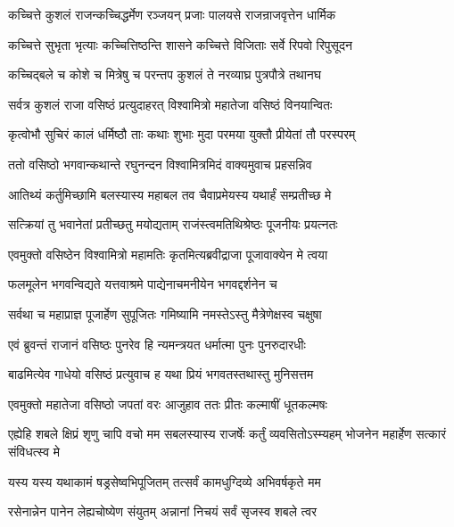 \twolineshloka
{कच्चित्ते कुशलं राजन्कच्चिद्धर्मेण रञ्जयन्}
{प्रजाः पालयसे राजन्राजवृत्तेन धार्मिक} %

\twolineshloka
{कच्चित्ते सुभृता भृत्याः कच्चित्तिष्ठन्ति शासने}
{कच्चित्ते विजिताः सर्वे रिपवो रिपुसूदन} %

\twolineshloka
{कच्चिद्बले च कोशे च मित्रेषु च परन्तप}
{कुशलं ते नरव्याघ्र पुत्रपौत्रे तथानघ} %

\twolineshloka
{सर्वत्र कुशलं राजा वसिष्ठं प्रत्युदाहरत्}
{विश्वामित्रो महातेजा वसिष्ठं विनयान्वितः} %

\twolineshloka
{कृत्वोभौ सुचिरं कालं धर्मिष्ठौ ताः कथाः शुभाः}
{मुदा परमया युक्तौ प्रीयेतां तौ परस्परम्} %

\twolineshloka
{ततो वसिष्ठो भगवान्कथान्ते रघुनन्दन}
{विश्वामित्रमिदं वाक्यमुवाच प्रहसन्निव} %

\twolineshloka
{आतिथ्यं कर्तुमिच्छामि बलस्यास्य महाबल}
{तव चैवाप्रमेयस्य यथार्हं सम्प्रतीच्छ मे} %

\twolineshloka
{सत्क्रियां तु भवानेतां प्रतीच्छतु मयोद्यताम्}
{राजंस्त्वमतिथिश्रेष्ठः पूजनीयः प्रयत्नतः} %

\twolineshloka
{एवमुक्तो वसिष्ठेन विश्वामित्रो महामतिः}
{कृतमित्यब्रवीद्राजा पूजावाक्येन मे त्वया} %

\twolineshloka
{फलमूलेन भगवन्विद्यते यत्तवाश्रमे}
{पाद्येनाचमनीयेन भगवद्दर्शनेन च} %

\twolineshloka
{सर्वथा च महाप्राज्ञ पूजार्हेण सुपूजितः}
{गमिष्यामि नमस्तेऽस्तु मैत्रेणेक्षस्व चक्षुषा} %

\twolineshloka
{एवं ब्रुवन्तं राजानं वसिष्ठः पुनरेव हि}
{न्यमन्त्रयत धर्मात्मा पुनः पुनरुदारधीः} %

\twolineshloka
{बाढमित्येव गाधेयो वसिष्ठं प्रत्युवाच ह}
{यथा प्रियं भगवतस्तथास्तु मुनिसत्तम} %

\twolineshloka
{एवमुक्तो महातेजा वसिष्ठो जपतां वरः}
{आजुहाव ततः प्रीतः कल्माषीं धूतकल्मषः} %

\threelineshloka
{एह्येहि शबले क्षिप्रं शृणु चापि वचो मम}
{सबलस्यास्य राजर्षेः कर्तुं व्यवसितोऽस्म्यहम्}
{भोजनेन महार्हेण सत्कारं संविधत्स्व मे} %

\twolineshloka
{यस्य यस्य यथाकामं षड्रसेष्वभिपूजितम्}
{तत्सर्वं कामधुग्दिव्ये अभिवर्षकृते मम} %

\twolineshloka
{रसेनान्नेन पानेन लेह्यचोष्येण संयुतम्}
{अन्नानां निचयं सर्वं सृजस्व शबले त्वर} %


